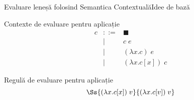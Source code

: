 \documentclass[xcolor=pdftex,romanian,colorlinks]{beamer}
\begin{document}
\begin{frame}{Evaluare leneșă folosind Semantica Contextuală}{Idee de bază}
\begin{block}{Contexte de evaluare pentru aplicație}
 \[\begin{array}{crl}
c & \mathrel{::=} & {\blacksquare} \\
 & \mid & c\; e\\
 & \mid & (\lambda x. c)\; e \\
 & \mid & (\lambda x . c[x])\; c 
\end{array}
\]
\end{block}

\begin{block}{Regulă de evaluare pentru aplicație}
 \[
\Ss{(\lambda x . c[x])\; v}{(\lambda x . c[v])\; v}
\]
\end{block}


\end{frame}
%
%
\end{document}
